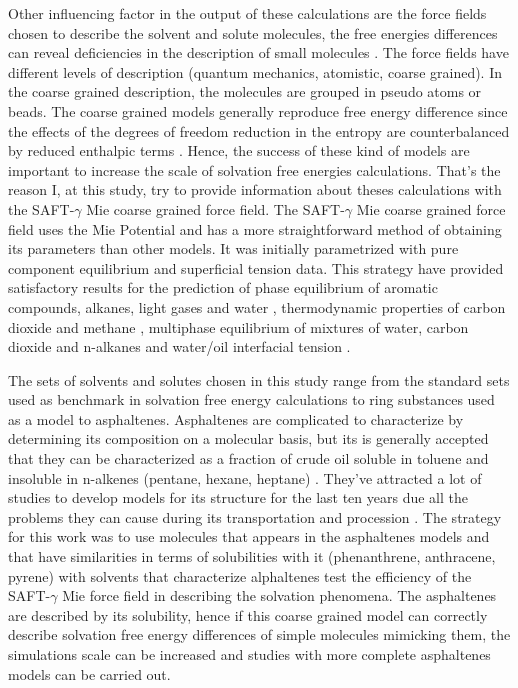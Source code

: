 Other influencing factor in the output of these calculations are the force fields chosen to describe the solvent and solute molecules, the free energies differences  can reveal deficiencies in the description of small molecules \cite{mobley2007,shirts2013}. The force fields have different levels of description (quantum mechanics, atomistic, coarse grained). In the coarse grained description, the molecules are grouped in pseudo atoms or beads. The coarse grained models generally reproduce free energy difference since the effects of the degrees of freedom reduction  in the entropy are counterbalanced by reduced enthalpic terms \cite{kmiecik2016}. Hence, the success of these kind of models are important to  increase the scale of solvation free energies calculations. That's the reason I, at this study, try to provide information about theses calculations with the SAFT-$\gamma$ Mie coarse grained force field. The SAFT-$\gamma$ Mie coarse grained force field uses the Mie Potential \cite{MIE} and has a more straightforward method of obtaining its parameters than other models. It was initially parametrized with pure component equilibrium and superficial tension data. This strategy have provided satisfactory results for the prediction of phase equilibrium of aromatic compounds, alkanes, light gases and water \cite{herdes2015,muller2017,lobanova2015} , thermodynamic properties of carbon dioxide and methane \cite{cassiano1}, multiphase equilibrium of mixtures of water, carbon dioxide and n-alkanes \cite{lobanova2016} and water/oil interfacial tension \cite{herdes2017}.  

The sets of solvents and solutes chosen in this study range from the standard sets used as benchmark in solvation free energy calculations to ring substances used as a model to asphaltenes. Asphaltenes are complicated to characterize by determining its composition on a molecular basis, but its is generally accepted that they can be characterized as a fraction of crude oil soluble in toluene and insoluble in n-alkenes (pentane, hexane, heptane) \cite{SJOBLOM2003399}. They've attracted a  lot of studies to develop models for its structure for the last ten years  due all the problems they can cause during its transportation and procession \cite{SJOBLOM20151}. The strategy for this work was to use molecules that appears in the asphaltenes models and that have similarities in terms of solubilities with it (phenanthrene, anthracene, pyrene) with solvents that characterize alphaltenes test the efficiency of the SAFT-$\gamma$ Mie force field in describing the solvation phenomena. The asphaltenes are described by its solubility, hence if this coarse grained model can correctly describe solvation free energy differences of simple molecules mimicking them, the simulations scale can be increased and studies with more complete asphaltenes models can be carried out.

